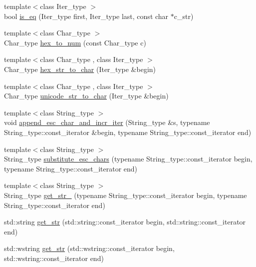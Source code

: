 \begin{DoxyCompactItemize}
\item 
{\footnotesize template$<$class Iter\+\_\+type $>$ }\\bool \hyperlink{namespacejson__spirit_a53e80b1bd29d90350b3da6fff580b050}{is\+\_\+eq} (Iter\+\_\+type first, Iter\+\_\+type last, const char $\ast$c\+\_\+str)
\item 
{\footnotesize template$<$class Char\+\_\+type $>$ }\\Char\+\_\+type \hyperlink{namespacejson__spirit_a8344e49f7e655382be49c45cf4d6163b}{hex\+\_\+to\+\_\+num} (const Char\+\_\+type c)
\item 
{\footnotesize template$<$class Char\+\_\+type , class Iter\+\_\+type $>$ }\\Char\+\_\+type \hyperlink{namespacejson__spirit_a7219596848f3e2b5428a8526178ba14a}{hex\+\_\+str\+\_\+to\+\_\+char} (Iter\+\_\+type \&begin)
\item 
{\footnotesize template$<$class Char\+\_\+type , class Iter\+\_\+type $>$ }\\Char\+\_\+type \hyperlink{namespacejson__spirit_a2c710514f8ef0633145aa56121c87cf8}{unicode\+\_\+str\+\_\+to\+\_\+char} (Iter\+\_\+type \&begin)
\item 
{\footnotesize template$<$class String\+\_\+type $>$ }\\void \hyperlink{namespacejson__spirit_a037ac1ac79edad3a30c21d90c79b7c9c}{append\+\_\+esc\+\_\+char\+\_\+and\+\_\+incr\+\_\+iter} (String\+\_\+type \&s, typename String\+\_\+type\+::const\+\_\+iterator \&begin, typename String\+\_\+type\+::const\+\_\+iterator end)
\item 
{\footnotesize template$<$class String\+\_\+type $>$ }\\String\+\_\+type \hyperlink{namespacejson__spirit_a32f8593d9468f269cbe9a2555a0a60c4}{substitute\+\_\+esc\+\_\+chars} (typename String\+\_\+type\+::const\+\_\+iterator begin, typename String\+\_\+type\+::const\+\_\+iterator end)
\item 
{\footnotesize template$<$class String\+\_\+type $>$ }\\String\+\_\+type \hyperlink{namespacejson__spirit_a1f9bd28ced5a2e0b84929f439138c91b}{get\+\_\+str\+\_\+} (typename String\+\_\+type\+::const\+\_\+iterator begin, typename String\+\_\+type\+::const\+\_\+iterator end)
\item 
std\+::string \hyperlink{namespacejson__spirit_acdef70e45909522ba51a74b68e186b25}{get\+\_\+str} (std\+::string\+::const\+\_\+iterator begin, std\+::string\+::const\+\_\+iterator end)
\item 
std\+::wstring \hyperlink{namespacejson__spirit_ad8f8578288693f4dd36a6f742e649fae}{get\+\_\+str} (std\+::wstring\+::const\+\_\+iterator begin, std\+::wstring\+::const\+\_\+iterator end)

\end{DoxyCompactItemize}
